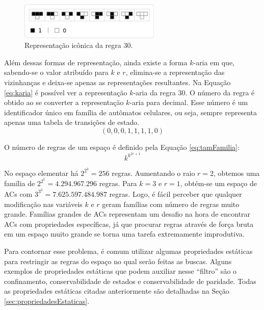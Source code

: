 \documentclass[12pt,a4paper]{article}
\begin{document}
	\begin{figure}[h!]
	  \centering
	  \includegraphics[width=0.6\textwidth]{fig_repIconicaR30.pdf}
	  \caption{Representação icônica da regra 30.}
	  \label{fig:repIconicaR30}
	\end{figure}

Além dessas formas de representação, ainda existe a forma $k$-aria em que, sabendo-se o valor atribuído para $k$ e $r$, elimina-se a representação das vizinhanças e deixa-se apenas as representações resultantes. Na Equação \ref{eq:karia} é possível ver a representação $k$-aria da regra 30. O número da regra é obtido ao se converter a representação $k$-aria para decimal. Esse número é um identificador único em família de autômatos celulares, ou seja, sempre representa apenas uma tabela de transições de estado.
\begin{equation}
(0,0,0,1,1,1,1,0)
\label{eq:karia}
\end{equation}

O número de regras de um espaço é definido pela Equação \ref{eq:tamFamilia}:
\begin{equation}
k^{k^{2r+1}}
\label{eq:tamFamilia}
\end{equation}

No espaço elementar há $2^{2^{3}} = 256$ regras. Aumentando o raio $r=2$, obtemos uma família de $2^{2^{5}} = 4.294.967.296$ regras. Para $k=3$ e $r=1$, obtém-se um espaço de ACs com $3^{3^{3}} = 7.625.597.484.987$ regras. Logo, é fácil perceber que qualquer modificação nas variáveis $k$ e $r$ geram famílias com número de regras muito grande. Famílias grandes de ACs representam um desafio na hora de encontrar ACs com propriedades específicas, já que procurar regras através de força bruta em um espaço muito grande se torna uma tarefa extremamente improdutiva.

Para contornar esse problema, é comum utilizar algumas propriedades estáticas para restringir as regras do espaço no qual serão feitas as buscas. Alguns exemplos de propriedades estáticas que podem auxiliar nesse ``filtro'' são o confinamento, conservabilidade de estados e conservabilidade de paridade. Todas as propriedades estáticas citadas anteriormente são detalhadas na Seção \ref{sec:propriedadesEstaticas}.
\end{document}
